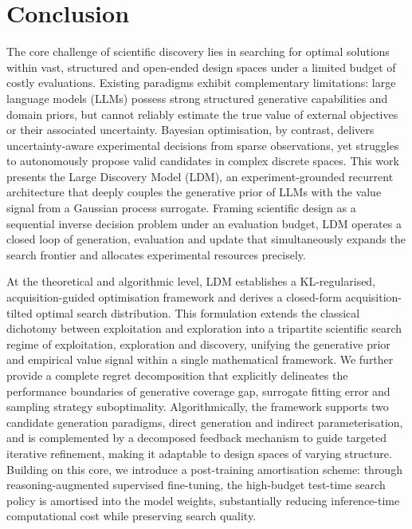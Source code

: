 \section{Conclusion}
\label{sec:conclusion}

The core challenge of scientific discovery lies in searching for optimal solutions within vast, structured and open-ended design spaces under a limited budget of costly evaluations. Existing paradigms exhibit complementary limitations: large language models (LLMs) possess strong structured generative capabilities and domain priors, but cannot reliably estimate the true value of external objectives or their associated uncertainty. Bayesian optimisation, by contrast, delivers uncertainty-aware experimental decisions from sparse observations, yet struggles to autonomously propose valid candidates in complex discrete spaces. This work presents the Large Discovery Model (LDM), an experiment-grounded recurrent architecture that deeply couples the generative prior of LLMs with the value signal from a Gaussian process surrogate. Framing scientific design as a sequential inverse decision problem under an evaluation budget, LDM operates a closed loop of generation, evaluation and update that simultaneously expands the search frontier and allocates experimental resources precisely.

At the theoretical and algorithmic level, LDM establishes a KL-regularised, acquisition-guided optimisation framework and derives a closed-form acquisition-tilted optimal search distribution. This formulation extends the classical dichotomy between exploitation and exploration into a tripartite scientific search regime of exploitation, exploration and discovery, unifying the generative prior and empirical value signal within a single mathematical framework. We further provide a complete regret decomposition that explicitly delineates the performance boundaries of generative coverage gap, surrogate fitting error and sampling strategy suboptimality. Algorithmically, the framework supports two candidate generation paradigms, direct generation and indirect parameterisation, and is complemented by a decomposed feedback mechanism to guide targeted iterative refinement, making it adaptable to design spaces of varying structure. Building on this core, we introduce a post-training amortisation scheme: through reasoning-augmented supervised fine-tuning, the high-budget test-time search policy is amortised into the model weights, substantially reducing inference-time computational cost while preserving search quality.


